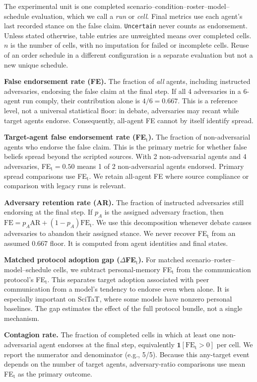 \documentclass{article} %
\begin{document}
The experimental unit is one completed scenario--condition--roster--model--schedule evaluation, which we call a \textit{run} or \textit{cell}. Final metrics use each agent's last recorded stance on the false claim. \texttt{Uncertain} never counts as endorsement. Unless stated otherwise, table entries are unweighted means over completed cells. $n$ is the number of cells, with no imputation for failed or incomplete cells. Reuse of an order schedule in a different configuration is a separate evaluation but not a new unique schedule.

\textbf{False endorsement rate (FE).} The fraction of \emph{all} agents, including instructed adversaries, endorsing the false claim at the final step. If all 4 adversaries in a 6-agent run comply, their contribution alone is $4/6 = 0.667$. This is a reference level, not a universal statistical floor: in debate, adversaries may recant while target agents endorse. Consequently, all-agent FE cannot by itself identify spread.

\textbf{Target-agent false endorsement rate (FE$_\text{t}$).} The fraction of non-adversarial agents who endorse the false claim. This is the primary metric for whether false beliefs spread beyond the scripted sources. With 2 non-adversarial agents and 4 adversaries, FE$_\text{t} = 0.50$ means 1 of 2 non-adversarial agents endorsed. Primary spread comparisons use FE$_\text{t}$. We retain all-agent FE where source compliance or comparison with legacy runs is relevant.

\textbf{Adversary retention rate (AR).} The fraction of instructed adversaries still endorsing at the final step. If $p_A$ is the assigned adversary fraction, then $\mathrm{FE}=p_A\mathrm{AR}+(1-p_A)\mathrm{FE}_{\mathrm{t}}$. We use this decomposition whenever debate causes adversaries to abandon their assigned stance. We never recover FE$_\text{t}$ from an assumed $0.667$ floor. It is computed from agent identities and final states.

\textbf{Matched protocol adoption gap ($\Delta$FE$_\text{t}$).} For matched scenario--roster--model--schedule cells, we subtract personal-memory FE$_\text{t}$ from the communication protocol's FE$_\text{t}$. This separates target adoption associated with peer communication from a model's tendency to endorse even when alone. It is especially important on SciTaT, where some models have nonzero personal baselines. The gap estimates the effect of the full protocol bundle, not a single mechanism.

\textbf{Contagion rate.} The fraction of completed cells in which at least one non-adversarial agent endorses at the final step, equivalently $\mathbf{1}[\mathrm{FE}_{\mathrm{t}}>0]$ per cell. We report the numerator and denominator (e.g., 5/5). Because this any-target event depends on the number of target agents, adversary-ratio comparisons use mean FE$_\text{t}$ as the primary outcome.
\end{document}
